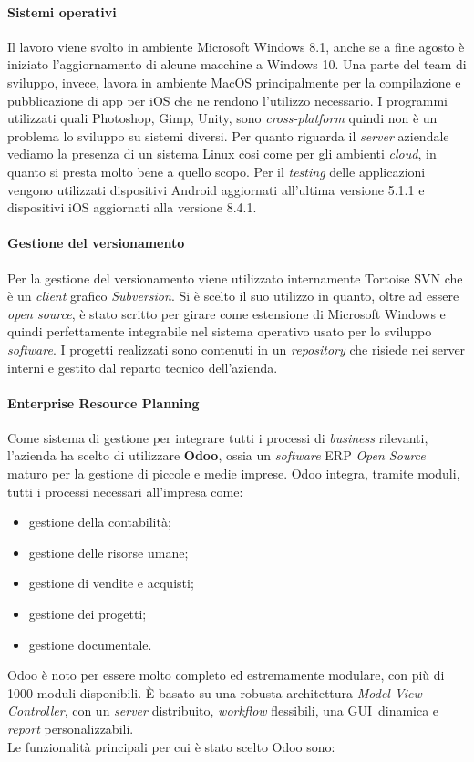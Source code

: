 \paragraph{Sistemi operativi}
Il lavoro viene svolto in ambiente Microsoft Windows 8.1, anche se a fine agosto \`e iniziato l'aggiornamento di alcune macchine a Windows 10. Una parte del team di sviluppo, invece, lavora in ambiente MacOS principalmente per la compilazione e pubblicazione di app per iOS che ne rendono l'utilizzo necessario. I programmi utilizzati quali Photoshop, Gimp, Unity, sono \textit{cross-platform\gloss} quindi non \`e un problema lo sviluppo su sistemi diversi. 
Per quanto riguarda il \textit{server} aziendale vediamo la presenza di un sistema Linux cosi come per gli ambienti \textit{cloud}, in quanto si presta molto bene a quello scopo.
Per il \textit{testing} delle applicazioni vengono utilizzati dispositivi Android aggiornati all'ultima versione 5.1.1 e dispositivi iOS aggiornati alla versione 8.4.1.

\paragraph{Gestione del versionamento}
Per la gestione del versionamento viene utilizzato internamente Tortoise SVN che \`e un \textit{client} grafico \textit{Subversion}. Si \`e scelto il suo utilizzo in quanto, oltre ad essere \textit{open source}, \`e stato scritto per girare come estensione di Microsoft Windows e quindi perfettamente integrabile nel sistema operativo usato per lo sviluppo \textit{software\gloss}.
I progetti realizzati sono contenuti in un \textit{repository} che risiede nei server interni e gestito dal reparto tecnico dell'azienda.

\paragraph{Enterprise Resource Planning}
Come sistema di gestione per integrare tutti i processi di \textit{business\gloss} rilevanti, l'azienda ha scelto di utilizzare \textbf{Odoo}, ossia un \textit{software\gloss} ERP \textit{Open Source} maturo per la gestione di piccole e medie imprese. 
Odoo integra, tramite moduli, tutti i processi necessari all'impresa come:
\begin{itemize}
	\item gestione della contabilità;
	\item gestione delle risorse umane;
	\item gestione di vendite e acquisti;
	\item gestione dei progetti;
	\item gestione documentale.
\end{itemize}
\noindent
Odoo è noto per essere molto completo ed estremamente modulare, con più di 1000 moduli disponibili. È basato su una robusta architettura \textit{Model-View-Controller}, con un \textit{server} distribuito, \textit{workflow} flessibili, una GUI\gloss\ dinamica e \textit{report} personalizzabili.
\\
Le funzionalit\`a principali per cui \`e stato scelto Odoo sono:

